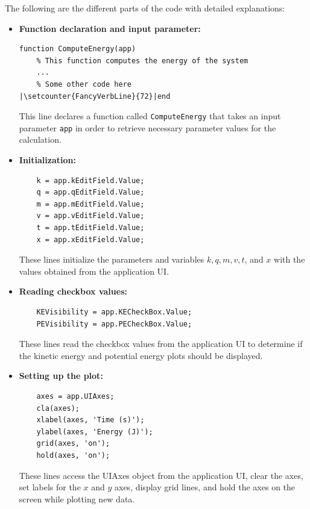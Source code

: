 \documentclass[13pt,a4paper]{report}
\begin{document}
The following are the different parts of the code with detailed explanations:

\begin{itemize}[leftmargin=0.1cm]

\item \textbf{Function declaration and input parameter:}

\begin{verbatim}
function ComputeEnergy(app)
    % This function computes the energy of the system
    ...
    % Some other code here
|\setcounter{FancyVerbLine}{72}|end
\end{verbatim}

This line declares a function called \texttt{ComputeEnergy} that takes an input parameter \texttt{app} in order to retrieve necessary parameter values for the calculation.

\item \textbf{Initialization:}

\begin{verbatim}
    k = app.kEditField.Value;
    q = app.qEditField.Value;
    m = app.mEditField.Value;
    v = app.vEditField.Value;
    t = app.tEditField.Value;
    x = app.xEditField.Value;
\end{verbatim}

These lines initialize the parameters and variables $k, q, m, v, t$, and $x$ with the values obtained from the application UI.

\newpage
\item \textbf{Reading checkbox values:}

\begin{verbatim}
    KEVisibility = app.KECheckBox.Value;
    PEVisibility = app.PECheckBox.Value;
\end{verbatim}

These lines read the checkbox values from the application UI to determine if the kinetic energy and potential energy plots should be displayed.

\item \textbf{Setting up the plot:}

\begin{verbatim}
    axes = app.UIAxes;
    cla(axes);
    xlabel(axes, 'Time (s)');
    ylabel(axes, 'Energy (J)');
    grid(axes, 'on');
    hold(axes, 'on');
\end{verbatim}

These lines access the UIAxes object from the application UI, clear the axes, set labels for the $x$ and $y$ axes, display grid lines, and hold the axes on the screen while plotting new data.


\end{itemize}
\end{document}

